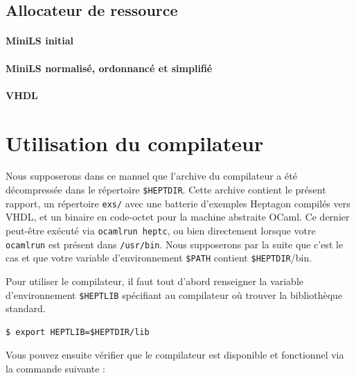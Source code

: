 \documentclass[a4paper]{article}
\newcommand{\LANG}{{\sc Heptagon}}
\begin{document}
\subsection{Allocateur de ressource}

\paragraph{MiniLS initial}

\small

\normalsize

\paragraph{MiniLS normalis\'e, ordonnanc\'e et simplifi\'e}

\small

\normalsize

\paragraph{VHDL}

\small

\normalsize

\section{Utilisation du compilateur}

Nous supposerons dans ce manuel que l'archive du compilateur a \'et\'e
d\'ecompress\'ee dans le r\'epertoire \verb/$HEPTDIR/. Cette archive contient le
pr\'esent rapport, un r\'epertoire \texttt{exs/} avec une batterie d'exemples
\LANG{} compil\'es vers VHDL, et un binaire en code-octet pour la machine
abstraite OCaml. Ce dernier peut-\^etre ex\'ecut\'e via \texttt{ocamlrun heptc},
ou bien directement lorsque votre \texttt{ocamlrun} est pr\'esent dans
\texttt{/usr/bin}. Nous supposerons par la suite que c'est le cas et que votre
variable d'environnement \verb/$PATH/ contient \verb/$HEPTDIR//bin.

Pour utiliser le compilateur, il faut tout d'abord renseigner la variable
d'environnement \verb/$HEPTLIB/ sp\'ecifiant au compilateur o\`u trouver la
biblioth\`eque standard.

\begin{verbatim}
$ export HEPTLIB=$HEPTDIR/lib
\end{verbatim}

Vous pouvez ensuite v\'erifier que le compilateur est disponible et fonctionnel
via la commande suivante :
\end{document}

